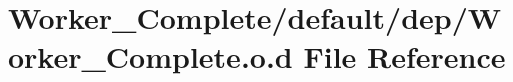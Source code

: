 \hypertarget{_worker___complete_8o_8d}{
\section{Worker\_\-Complete/default/dep/Worker\_\-Complete.o.d File Reference}
\label{_worker___complete_8o_8d}
}
